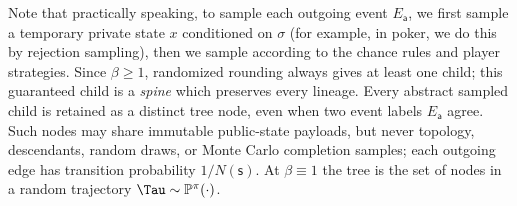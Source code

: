 \documentclass[12pt, a4paper]{article}
\begin{document}
\begin{remark}
  Note that practically speaking, to sample each outgoing event $E_{\mathsf{a}}$, we first sample a temporary private state $x$ conditioned on $\sigma$ (for example, in poker, we do this by rejection sampling), then we sample according to the chance rules and player strategies.
  Since $\beta\geq1$, randomized rounding always gives at least one child; this guaranteed child is a \emph{spine} which preserves every lineage.
  Every abstract sampled child is retained as a distinct tree node, even when two event labels $E_{\mathsf a}$ agree.
  Such nodes may share immutable public-state payloads, but never topology, descendants, random draws, or Monte Carlo completion samples; each outgoing edge has transition probability $1/N(\mathsf s)$.
  At $\beta \equiv 1$ the tree is the set of nodes in a random trajectory $\Tau \sim \mathbb{P}^\pi(\cdot)$.
\end{remark}
\end{document}
